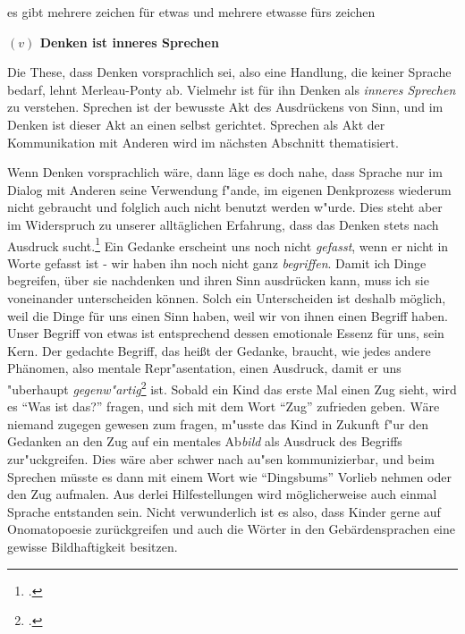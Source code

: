 \documentclass[a4paper, 12pt]{article}
\begin{document}
\begin{onehalfspace}
es gibt mehrere zeichen für etwas und mehrere etwasse fürs zeichen

\vspace{5mm}

\noindent\textbf{$(v)$ Denken ist inneres Sprechen}

\noindent Die These, dass Denken vorsprachlich sei, also eine Handlung, die keiner Sprache bedarf, lehnt Merleau-Ponty ab. Vielmehr ist für ihn Denken als \emph{inneres Sprechen} zu verstehen. Sprechen ist der bewusste Akt des Ausdrückens von Sinn, und im Denken ist dieser Akt an einen selbst gerichtet. Sprechen als Akt der Kommunikation mit Anderen wird im nächsten Abschnitt thematisiert. 

Wenn Denken vorsprachlich wäre, dann läge es doch nahe, dass Sprache nur im Dialog mit Anderen seine Verwendung f"ande, im eigenen Denkprozess wiederum nicht gebraucht und folglich auch nicht benutzt werden w"urde. Dies steht aber im Widerspruch zu unserer alltäglichen Erfahrung, dass das Denken stets nach Ausdruck sucht.\footnote{\cite[Vgl.][S. 216]{merleau1966phanomenologie}.} Ein Gedanke erscheint uns noch nicht \emph{gefasst}, wenn er nicht in Worte gefasst ist - wir haben ihn noch nicht ganz \emph{begriffen}. Damit ich Dinge begreifen, über sie nachdenken und ihren Sinn ausdrücken kann, muss ich sie voneinander unterscheiden können. Solch ein Unterscheiden ist deshalb möglich, weil die Dinge für uns einen Sinn haben, weil wir von ihnen einen Begriff haben. Unser Begriff von etwas ist entsprechend dessen emotionale Essenz für uns, sein Kern. Der gedachte Begriff, das heißt der Gedanke, braucht, wie jedes andere Phänomen, also mentale Repr"asentation, einen Ausdruck, damit er uns "uberhaupt \emph{gegenw"artig}\footnote{\cite[Vgl.][S. 215 f.]{merleau1966phanomenologie}.} ist. Sobald ein Kind das erste Mal einen Zug sieht, wird es "`Was ist das?"' fragen, und sich mit dem Wort "`Zug"' zufrieden geben. Wäre niemand zugegen gewesen zum fragen, m"usste das Kind in Zukunft f"ur den Gedanken an den Zug auf ein mentales Ab\emph{bild} als Ausdruck des Begriffs zur"uckgreifen. Dies wäre aber schwer nach au"sen kommunizierbar, und beim Sprechen müsste es dann mit einem Wort wie "`Dingsbums"' Vorlieb nehmen oder den Zug aufmalen. Aus derlei Hilfestellungen wird möglicherweise auch einmal Sprache entstanden sein. Nicht verwunderlich ist es also, dass Kinder gerne auf Onomatopoesie zurückgreifen und auch die Wörter in den Gebärdensprachen eine gewisse Bildhaftigkeit besitzen. 


\end{onehalfspace}
\end{document}
